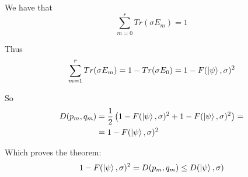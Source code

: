 \documentclass{masterthesis}
\begin{document}
We have that 
\begin{equation}
    \sum_{m=0}^{r} Tr(\sigma E_m) = 1
\end{equation}

Thus
\begin{equation}
    \sum_{m=1}^{r} Tr(\sigma E_m) = 1 - Tr(\sigma E_0) = 1 - F(\ket{\psi}, \sigma)^2
\end{equation}

So
\begin{align}
    D(p_m, q_m) &= \frac{1}{2} \left(1 - F(\ket{\psi}, \sigma)^2 + 1 - F(\ket{\psi}, \sigma)^2 \right) = \\
    &= 1 - F(\ket{\psi}, \sigma)^2 
\end{align}

Which proves the theorem:
\begin{equation}
    1 - F(\ket{\psi}, \sigma)^2 = D(p_m, q_m) \leq D(\ket{\psi}, \sigma)
\end{equation}
\end{document}
